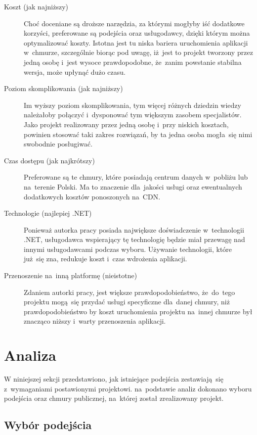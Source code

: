 \documentclass[12pt,a4paper,twoside,titlepage,openright]{book}
\begin{document}
\begin{description}
\item [Koszt (jak najniższy)] Choć doceniane są droższe narzędzia, za którymi mogłyby iść dodatkowe korzyści, preferowane są podejścia oraz usługodawcy, dzięki którym można optymalizować koszty. Istotna jest tu niska bariera uruchomienia aplikacji w~chmurze, szczególnie biorąc pod uwagę, iż~jest to projekt tworzony przez jedną osobę i~jest wysoce prawdopodobne, że~zanim powstanie stabilna wersja, może upłynąć dużo czasu.
\item [Poziom skomplikowania (jak najniższy)] Im wyższy poziom skomplikowania, tym więcej różnych dziedzin wiedzy należałoby połączyć i~dysponować tym większym zasobem specjalistów. Jako projekt realizowany przez jedną osobę i~przy niskich kosztach, powinien stosować taki zakres rozwiązań, by ta jedna osoba mogła~się nimi swobodnie posługiwać.
\item [Czas dostępu (jak najkrótszy)] Preferowane są te chmury, które posiadają centrum danych w~pobliżu lub na~terenie Polski. Ma to znaczenie dla~jakości usługi oraz ewentualnych dodatkowych kosztów ponoszonych na~CDN.
\item [Technologie (najlepiej .NET)] Ponieważ autorka pracy posiada największe doświadczenie w~technologii .NET, usługodawca wspierający tę technologię będzie miał przewagę nad innymi usługodawcami podczas wyboru. Używanie technologii, które już~się zna, redukuje koszt i~czas wdrożenia aplikacji.
\item [Przenoszenie na~inną platformę (nieistotne)] Zdaniem autorki pracy, jest większe prawdopodobieństwo, że~do~tego projektu mogą~się przydać usługi specyficzne dla~danej chmury, niż prawdopodobieństwo by koszt uruchomienia projektu na~innej chmurze był znacząco niższy i~warty przenoszenia aplikacji. 
\end{description}

\section{Analiza}

W niniejszej sekcji przedstawiono, jak istniejące podejścia zestawiają~się z~wymaganiami postawionymi projektowi. na~podstawie analiz dokonano wyboru podejścia oraz chmury publicznej, na~której został zrealizowany projekt.

\subsection{Wybór podejścia}
\end{document}
